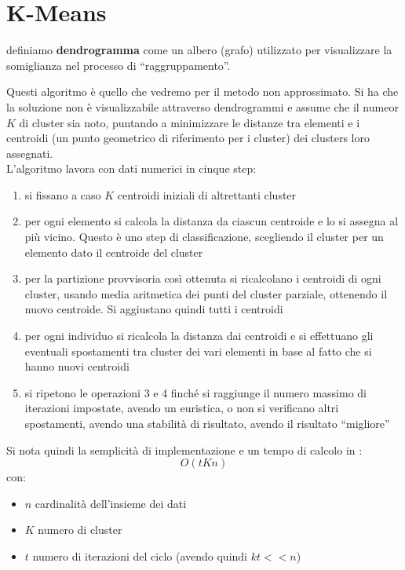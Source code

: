 \documentclass[a4paper,12pt, oneside]{book}
\begin{document}
\section{K-Means}
\begin{definizione}
  definiamo \textbf{dendrogramma} come un albero (grafo) utilizzato per
  visualizzare la somiglianza nel processo di ``raggruppamento''.
  
\end{definizione}
Questi algoritmo è quello che vedremo per il metodo non approssimato. Si ha che
la  soluzione non è visualizzabile attraverso dendrogrammi e assume che il
numeor $K$ di cluster sia noto, puntando a minimizzare le distanze tra elementi
e i centroidi (un punto geometrico di riferimento per i cluster) dei clusters
loro assegnati.\\
L'algoritmo lavora con dati numerici in cinque step:
\begin{enumerate}
  \item si fissano a caso $K$ centroidi iniziali di altrettanti cluster
  \item per ogni elemento si calcola la distanza da ciascun centroide e lo si
  assegna al più vicino. Questo è uno step di classificazione, scegliendo il cluster
  per un elemento dato il centroide del cluster
  \item per la partizione provvisoria così ottenuta si ricalcolano i centroidi
  di ogni cluster, usando media aritmetica dei punti del cluster parziale,
  ottenendo il nuovo centroide. Si aggiustano quindi tutti i centroidi
  \item per ogni individuo si ricalcola la distanza dai centroidi e si
  effettuano gli eventuali spostamenti tra cluster dei vari elementi in base al
  fatto che si hanno nuovi centroidi
  \item si ripetono le operazioni 3 e 4 finché si raggiunge il numero massimo di
  iterazioni impostate, avendo un euristica, o non si verificano altri
  spostamenti, avendo una stabilità di risultato, avendo il risultato
  ``migliore'' 
\end{enumerate}
Si nota quindi la semplicità di implementazione e un tempo di calcolo in :
\[O(tKn)\]
con:
\begin{itemize}
  \item $n$ cardinalità dell'insieme dei dati
  \item $K$ numero di cluster
  \item $t$ numero di iterazioni del ciclo (avendo quindi $kt<<n$)
\end{itemize}
\end{document}
